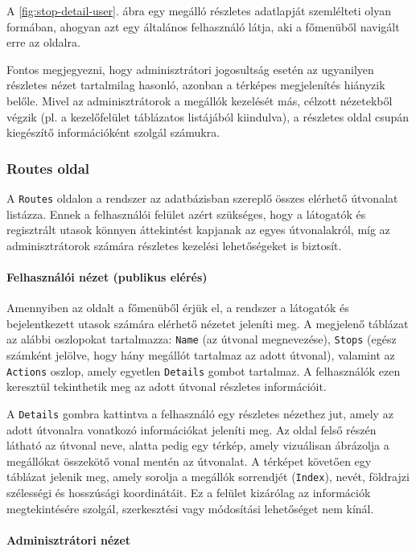 A \ref{fig:stop-detail-user}. ábra egy megálló részletes adatlapját szemlélteti olyan formában, ahogyan azt egy általános felhasználó látja, aki a főmenüből navigált erre az oldalra.

Fontos megjegyezni, hogy adminisztrátori jogosultság esetén az ugyanilyen részletes nézet tartalmilag hasonló, azonban a térképes megjelenítés hiányzik belőle. Mivel az adminisztrátorok a megállók kezelését más, célzott nézetekből végzik (pl. a kezelőfelület táblázatos listájából kiindulva), a részletes oldal csupán kiegészítő információként szolgál számukra.


\subsubsection{Routes oldal}

A \texttt{Routes} oldalon a rendszer az adatbázisban szereplő összes elérhető útvonalat listázza. Ennek a felhasználói felület azért szükséges, hogy a látogatók és regisztrált utasok könnyen áttekintést kapjanak az egyes útvonalakról, míg az adminisztrátorok számára részletes kezelési lehetőségeket is biztosít.

\paragraph{Felhasználói nézet (publikus elérés)}

Amennyiben az oldalt a főmenüből érjük el, a rendszer a látogatók és bejelentkezett utasok számára elérhető nézetet jeleníti meg. A megjelenő táblázat az alábbi oszlopokat tartalmazza: \texttt{Name} (az útvonal megnevezése), \texttt{Stops} (egész számként jelölve, hogy hány megállót tartalmaz az adott útvonal), valamint az \texttt{Actions} oszlop, amely egyetlen \texttt{Details} gombot tartalmaz. A felhasználók ezen keresztül tekinthetik meg az adott útvonal részletes információit.

A \texttt{Details} gombra kattintva a felhasználó egy részletes nézethez jut, amely az adott útvonalra vonatkozó információkat jeleníti meg. Az oldal felső részén látható az útvonal neve, alatta pedig egy térkép, amely vizuálisan ábrázolja a megállókat összekötő vonal mentén az útvonalat. A térképet követően egy táblázat jelenik meg, amely sorolja a megállók sorrendjét (\texttt{Index}), nevét, földrajzi szélességi és hosszúsági koordinátáit. Ez a felület kizárólag az információk megtekintésére szolgál, szerkesztési vagy módosítási lehetőséget nem kínál.

\paragraph{Adminisztrátori nézet}


